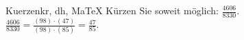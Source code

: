 \begin{MAufgabe}{Kuerzen}{kr, dh, MaTeX}
K\"urzen Sie soweit m\"oglich: $\frac{4606}{8330}$.\\ 
\ifLsg\MLoesung
\quad $\frac{4606}{8330}=\frac{(98)\cdot(47)}{(98)\cdot(85)}=\frac{47}{85}$.\else\relax\fi
 \end{MAufgabe}